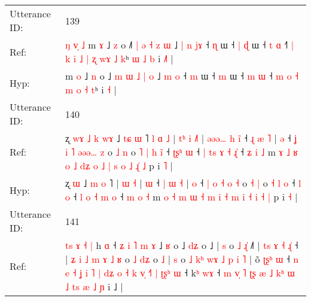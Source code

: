 \documentclass[10pt]{article}
\DeclareRobustCommand{\hl}[1]{{\textcolor{red}{#1}}}
\begin{document}
\begin{longtable}{ll}
 \\
\midrule
Utterance ID: & 139 \\
Ref: & \hl{ŋ}\hl{ }\hl{v}\hl{̩}\hl{ }\hl{˩}\hl{ }m \hl{ɤ} ˩ \hl{z} o ˩\hl{˥} \hl{|} \hl{ə} \hl{˧} \hl{z} \hl{ɯ} ˩\hl{ }\hl{|} \hl{n} \hl{j}\hl{ɤ} ˧ \hl{ɳ} ɯ ˧\hl{ }\hl{|} \hl{ɖ} ɯ ˧ \hl{t} \hl{ɑ} ˧\hl{˥}\hl{ }\hl{|}\hl{ }\hl{k} \hl{i} \hl{˩} \hl{|} \hl{ʐ} \hl{w}\hl{ɤ} \hl{˩} \hl{k}ʰ\hl{ }\hl{ɯ}\hl{ }\hl{˩}\hl{ }\hl{b} i \hl{˩}\hl{˥} |
 \\
Hyp: & \hl{}\hl{}\hl{}\hl{}\hl{}\hl{}\hl{}m \hl{o} ˩ \hl{n} o ˩\hl{} \hl{m} \hl{ɯ} \hl{˩} \hl{|} \hl{o} ˩\hl{}\hl{} \hl{m} \hl{}\hl{o} ˧ \hl{m} ɯ ˧\hl{}\hl{} \hl{m} ɯ ˧ \hl{m} \hl{ɯ} ˧\hl{}\hl{}\hl{}\hl{}\hl{} \hl{m} \hl{o} \hl{˧} \hl{m} \hl{}\hl{o} \hl{˧} \hl{t}ʰ\hl{}\hl{}\hl{}\hl{}\hl{}\hl{} i \hl{}\hl{˧} |
 \\
\midrule
Utterance ID: & 140 \\
Ref: & ʐ\hl{ }\hl{w}\hl{ɤ}\hl{ }\hl{˩}\hl{ }\hl{k} \hl{w}\hl{ɤ} ˩ \hl{t}\hl{ɕ} \hl{ɯ} ˥\hl{ }\hl{l}\hl{ }\hl{ɑ}\hl{ }\hl{˩} |\hl{ }\hl{t}\hl{ʰ} \hl{i} \hl{˩}\hl{˥} |\hl{ }\hl{ə}\hl{ə}\hl{ə}\hl{…}\hl{ }\hl{h} \hl{i}\hl{̃} ˧ \hl{ɻ} \hl{æ} \hl{˥} | \hl{ə} ˧ \hl{ʝ} \hl{i} \hl{˥} \hl{ə}\hl{ə}\hl{ə}\hl{…} \hl{z} o \hl{˩} \hl{n} o\hl{ }\hl{˥} \hl{|} \hl{h} \hl{i}\hl{̃} ˧ \hl{ʈ}\hl{ʂ}\hl{ʰ} \hl{ɯ} ˧ \hl{|} \hl{t}\hl{s} \hl{ɤ} \hl{˧} \hl{ɻ}\hl{̍} ˧ \hl{ʑ} \hl{i} \hl{˩} m \hl{ɤ} \hl{˩} \hl{ʁ} \hl{o} \hl{˩} \hl{d}\hl{ʑ} \hl{o} \hl{˩} \hl{|} \hl{s} \hl{o} \hl{˩} \hl{ɻ}\hl{̍} \hl{˩} p i \hl{˥} |
 \\
Hyp: & ʐ\hl{}\hl{}\hl{}\hl{}\hl{}\hl{}\hl{} \hl{}\hl{ɯ} ˩ \hl{}\hl{m} \hl{o} ˥\hl{}\hl{}\hl{}\hl{}\hl{}\hl{} |\hl{}\hl{}\hl{} \hl{ɯ} \hl{}\hl{˧} |\hl{}\hl{}\hl{}\hl{}\hl{}\hl{}\hl{} \hl{}\hl{ɯ} ˧ \hl{|} \hl{ɯ} \hl{˧} | \hl{o} ˧ \hl{|} \hl{o} \hl{˧} \hl{}\hl{}\hl{}\hl{o} \hl{˧} o \hl{˧} \hl{|} o\hl{}\hl{} \hl{˧} \hl{l} \hl{}\hl{o} ˧ \hl{}\hl{}\hl{l} \hl{o} ˧ \hl{l} \hl{}\hl{o} \hl{˧} \hl{m} \hl{}\hl{o} ˧ \hl{m} \hl{o} \hl{˧} m \hl{o} \hl{˧} \hl{m} \hl{ɯ} \hl{˧} \hl{}\hl{m} \hl{i} \hl{˧} \hl{m} \hl{i} \hl{˧} \hl{i} \hl{}\hl{˧} \hl{|} p i \hl{˧} |
 \\
\midrule
Utterance ID: & 141 \\
Ref: & \hl{t}\hl{s} \hl{ɤ}\hl{ }\hl{˧} \hl{|} h \hl{ɑ} ˧\hl{ }\hl{ʑ}\hl{ }\hl{i}\hl{ }\hl{˥} \hl{m} \hl{ɤ} ˩ \hl{ʁ} o ˩ \hl{d}\hl{ʑ} o ˩ |\hl{ }\hl{s} o\hl{ }\hl{˩}\hl{ }\hl{ɻ}\hl{̍} ˩\hl{˥} | \hl{t}\hl{s} \hl{ɤ} \hl{˧} \hl{ɻ}\hl{̍} ˧ |\hl{ }\hl{ʑ} \hl{i} \hl{˩} \hl{m} \hl{ɤ} \hl{˩} \hl{ʁ} o \hl{˩} \hl{d}\hl{ʑ} o \hl{˩} |\hl{ }\hl{s} o \hl{˩} \hl{k}\hl{ʰ} \hl{w}\hl{ɤ} \hl{˩} \hl{p} \hl{i} \hl{˥} | o\hl{̃}\hl{ }\hl{ʈ}\hl{ʂ}\hl{ʰ}\hl{ }\hl{ɯ} ˧ \hl{n} \hl{e} \hl{˧} \hl{ʝ} \hl{i} \hl{˥} \hl{|} \hl{d}\hl{ʑ} \hl{o} \hl{˧} \hl{k} \hl{v}\hl{̩} \hl{˧}\hl{˥} \hl{|} \hl{ʈ}\hl{ʂ}\hl{ʰ} \hl{ɯ} ˧ k\hl{ʰ} \hl{w}\hl{ɤ} ˧\hl{ }\hl{m} \hl{v}\hl{̩} \hl{˥} \hl{ʈ}\hl{ʂ} \hl{æ} \hl{˩} \hl{k}\hl{ʰ} \hl{ɯ} \hl{˩} \hl{t}\hl{s} \hl{æ} \hl{˩}\hl{ }\hl{ɲ} i ˩ |

\end{longtable}
\end{document}
